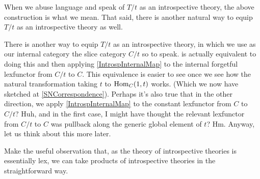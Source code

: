 When we abuse language and speak of $T/t$ as an introspective theory, the above construction is what we mean. That said, there is another natural way to equip $T/t$ as an introspective theory as well.

\begin{TODOblock}
There is another way to equip $T/t$ as an introspective theory, in which we use as our internal category the slice category $C/t$ so to speak.  is actually equivalent to doing this and then applying \cref{IntrospInternalMap} to the internal forgetful lexfunctor from $C/t$ to $C$. This equivalence is easier to see once we see how the natural transformation taking $t$ to $\operatorname{Hom}_C(1, t)$ works. (Which we now have sketched at \cref{SNCorrespondence}). Perhaps it's also true that in the other direction, we apply \cref{IntrospInternalMap} to the constant lexfunctor from $C$ to $C/t$? Huh, and in the first case, I might have thought the relevant lexfunctor from $C/t$ to $C$ was pullback along the generic global element of $t$? Hm. Anyway, let us think about this more later.
\end{TODOblock}

\begin{TODOblock}
Make the useful observation that, as the theory of introspective theories is essentially lex, we can take products of introspective theories in the straightforward way.
\end{TODOblock}
